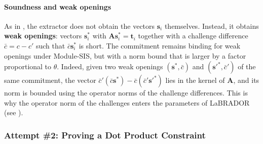 \documentclass[../../book.tex]{subfiles}
\begin{document}
\paragraph{Soundness and weak openings}
As in , the extractor does not obtain the vectors $\mathbf{s}_i$ themselves.
Instead, it obtains \textbf{weak openings}: vectors $\mathbf{s}_i^{\ast}$ with $\mathbf{A}\mathbf{s}_i^{\ast} = \mathbf{t}_i$ together with a challenge difference $\bar{c} = c - c'$ such that $\bar{c}\mathbf{s}_i^{\ast}$ is short.
The commitment remains binding for weak openings under Module-SIS, but with a norm bound that is larger by a factor proportional to $\theta$.
Indeed, given two weak openings $(\mathbf{s}^{\ast}, \bar{c})$ and $(\mathbf{s}'^{\ast}, \bar{c}')$ of the same commitment, the vector $\bar{c}'(\bar{c}\mathbf{s}^{\ast}) - \bar{c}(\bar{c}'\mathbf{s}'^{\ast})$ lies in the kernel of $\mathbf{A}$, and its norm is bounded using the operator norms of the challenge differences.
This is why the operator norm of the challenges enters the parameters of LaBRADOR (see ).

\subsubsection{Attempt \#2: Proving a Dot Product Constraint}
\end{document}

